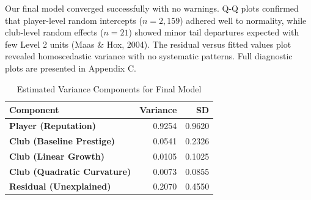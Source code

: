 \documentclass[
  12pt,
]{article}
\begin{document}
Our final model converged successfully with no warnings. Q-Q plots
confirmed that player-level random intercepts (\(n=2,159\)) adhered well
to normality, while club-level random effects (\(n=21\)) showed minor
tail departures expected with few Level 2 units (Maas \& Hox, 2004). The
residual versus fitted values plot revealed homoscedastic variance with
no systematic patterns. Full diagnostic plots are presented in Appendix
C.

\begin{table}[H]
\centering
\caption{Estimated Variance Components for Final Model}
\centering
\fontsize{11}{13}\selectfont
\begin{tabular}[t]{>{}l|r|r}
\hline
Component & Variance & SD\\
\hline
\textbf{Player (Reputation)} & 0.9254 & 0.9620\\
\textbf{Club (Baseline Prestige)} & 0.0541 & 0.2326\\
\textbf{Club (Linear Growth)} & 0.0105 & 0.1025\\
\textbf{Club (Quadratic Curvature)} & 0.0073 & 0.0855\\
\textbf{Residual (Unexplained)} & 0.2070 & 0.4550\\
\hline
\end{tabular}
\end{table}
\end{document}
